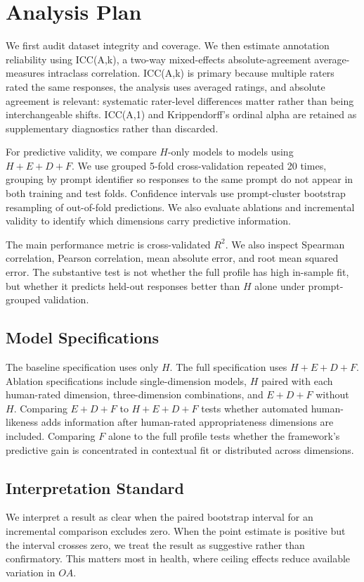 \documentclass[manuscript,review,anonymous]{acmart}
\begin{document}
\section{Analysis Plan}
We first audit dataset integrity and coverage. We then estimate annotation reliability using ICC(A,k), a two-way mixed-effects absolute-agreement average-measures intraclass correlation. ICC(A,k) is primary because multiple raters rated the same responses, the analysis uses averaged ratings, and absolute agreement is relevant: systematic rater-level differences matter rather than being interchangeable shifts. ICC(A,1) and Krippendorff's ordinal alpha are retained as supplementary diagnostics rather than discarded.

For predictive validity, we compare $H$-only models to models using $H+E+D+F$. We use grouped 5-fold cross-validation repeated 20 times, grouping by prompt identifier so responses to the same prompt do not appear in both training and test folds. Confidence intervals use prompt-cluster bootstrap resampling of out-of-fold predictions. We also evaluate ablations and incremental validity to identify which dimensions carry predictive information.

The main performance metric is cross-validated $R^2$. We also inspect Spearman correlation, Pearson correlation, mean absolute error, and root mean squared error. The substantive test is not whether the full profile has high in-sample fit, but whether it predicts held-out responses better than $H$ alone under prompt-grouped validation.

\subsection{Model Specifications}
The baseline specification uses only $H$. The full specification uses $H+E+D+F$. Ablation specifications include single-dimension models, $H$ paired with each human-rated dimension, three-dimension combinations, and $E+D+F$ without $H$. Comparing $E+D+F$ to $H+E+D+F$ tests whether automated human-likeness adds information after human-rated appropriateness dimensions are included. Comparing $F$ alone to the full profile tests whether the framework's predictive gain is concentrated in contextual fit or distributed across dimensions.

\subsection{Interpretation Standard}
We interpret a result as clear when the paired bootstrap interval for an incremental comparison excludes zero. When the point estimate is positive but the interval crosses zero, we treat the result as suggestive rather than confirmatory. This matters most in health, where ceiling effects reduce available variation in $OA$.
\end{document}
